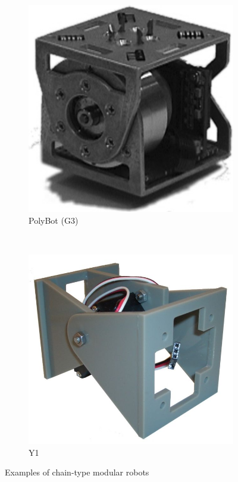 \begin{figure}[b]
\begin{subfigure}[b]{0.18\textwidth}
                \includegraphics[width=\textwidth]{images/PolyBot_G3.png}
                \caption{PolyBot (G3)}
                \label{fig:conf_PolyBot}
        \end{subfigure}
        ~
        \begin{subfigure}[b]{0.28\textwidth}
         	   \centering
                \includegraphics[width=\textwidth]{images/Y1_01.jpg}
                \caption{Y1}
                \label{fig:conf_Y1}
        \end{subfigure}
        \caption{Examples of chain-type modular robots}\label{fig:config_chain_examples}
\end{figure}

